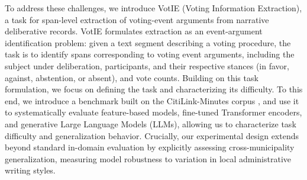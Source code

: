 \documentclass[11pt]{article}
\begin{document}



To address these challenges, we introduce VotIE (Voting Information Extraction), a task for span-level extraction of voting-event arguments from narrative deliberative records. VotIE formulates extraction as an event-argument identification problem: given a text segment describing a voting procedure, the task is to identify spans corresponding to voting event arguments, including the subject under deliberation, participants, and their respective stances (in favor, against, abstention, or absent), and vote counts. Building on this task formulation, we focus on defining the task and characterizing its difficulty. To this end, we introduce a benchmark built on the CitiLink-Minutes corpus \cite{CitiLinkMinutes2026}, and use it to systematically evaluate feature-based models, fine-tuned Transformer encoders, and generative Large Language Models (LLMs), allowing us to characterize task difficulty and generalization behavior. Crucially, our experimental design extends beyond standard in-domain evaluation by explicitly assessing cross-municipality generalization, measuring model robustness to variation in local administrative writing styles.
\end{document}
